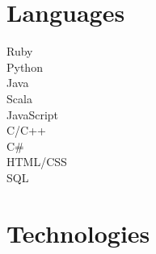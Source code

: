 \documentclass[]{deedy-resume}
\begin{document}
%
%

%
%

%
%

\begin{minipage}[t]{0.25\textwidth}


\section{Languages}
\textbullet{} Ruby \\
\textbullet{} Python \\
\textbullet{} Java \\
\textbullet{} Scala \\
\textbullet{} JavaScript \\
\textbullet{} C/C++ \\
\textbullet{} C\# \\
\textbullet{} HTML/CSS \\
\textbullet{} SQL \\

\section{Technologies}


\end{minipage}
\end{document}
